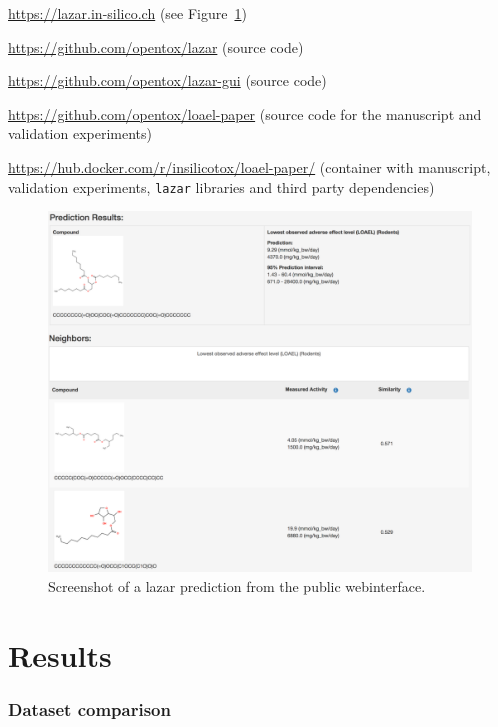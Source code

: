 \documentclass[]{achemso}
\providecommand{\tightlist}{%
  \setlength{\itemsep}{0pt}\setlength{\parskip}{0pt}}
\begin{document}
\begin{description}
\tightlist
\item[Public webinterface]
\url{https://lazar.in-silico.ch} (see Figure~\ref{fig:screenshot})
\item[\texttt{lazar} framework]
\url{https://github.com/opentox/lazar} (source code)
\item[\texttt{lazar} GUI]
\url{https://github.com/opentox/lazar-gui} (source code)
\item[Manuscript]
\url{https://github.com/opentox/loael-paper} (source code for the
manuscript and validation experiments)
\item[Docker image]
\url{https://hub.docker.com/r/insilicotox/loael-paper/} (container with
manuscript, validation experiments, \texttt{lazar} libraries and third
party dependencies)
\end{description}

\begin{figure}
\centering
\includegraphics{figures/lazar-screenshot.pdf}
\caption{Screenshot of a lazar prediction from the public
webinterface.}\label{fig:screenshot}
\end{figure}

\section{Results}\label{results}

\subsubsection{Dataset comparison}\label{dataset-comparison}
\end{document}
